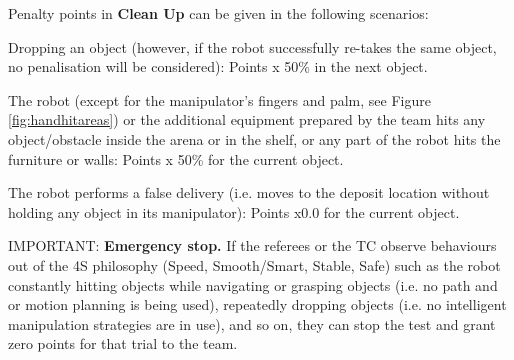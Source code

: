 \documentclass{article}
\newcommand{\SubItem}[1]{
    {\setlength\itemindent{15pt} \item[-] #1}
}
\begin{document}
\begin{itemize}
    \item Penalty points in \textbf{Clean Up} can be given in the following scenarios:
        \SubItem{Dropping an object (however, if the robot successfully re-takes the same object, no penalisation will be considered): Points x 50\% in the next object.}
        \SubItem{The robot (except for the manipulator's fingers and palm, see Figure \ref{fig:handhitareas}) or the additional equipment prepared by the team hits any object/obstacle inside the arena or in the shelf, or any part of the robot hits the furniture or walls: Points x 50\% for the current object.}
        \SubItem{The robot performs a false delivery (i.e. moves to the deposit location without holding any object in its manipulator): Points x0.0 for the current object.}
\end{itemize}

IMPORTANT: \textbf{Emergency stop.} If the referees or the TC observe behaviours out of the 4S philosophy (Speed, Smooth/Smart, Stable, Safe) such as the robot constantly hitting objects while navigating or grasping objects (i.e. no path and or motion planning is being used), repeatedly dropping objects (i.e. no intelligent manipulation strategies are in use), and so on, they can stop the test and grant zero points for that trial to the team.
\end{document}
